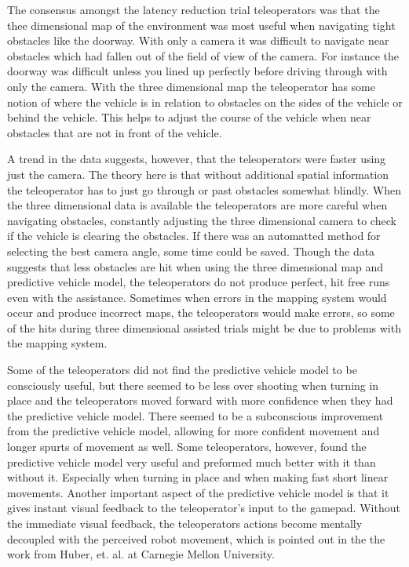 \documentclass[12pt]{report}
\begin{document}
The consensus amongst the latency reduction trial teleoperators was that the thee dimensional map of the environment was most useful when navigating tight obstacles like the doorway.  With only a camera it was difficult to navigate near obstacles which had fallen out of the field of view of the camera.  For instance the doorway was difficult unless you lined up perfectly before driving through with only the camera.  With the three dimensional map the teleoperator has some notion of where the vehicle is in relation to obstacles on the sides of the vehicle or behind the vehicle.  This helps to adjust the course of the vehicle when near obstacles that are not in front of the vehicle.

A trend in the data suggests, however, that the teleoperators were faster using just the camera.  The theory here is that without additional spatial information the teleoperator has to just go through or past obstacles somewhat blindly.  When the three dimensional data is available the teleoperators are more careful when navigating obstacles, constantly adjusting the three dimensional camera to check if the vehicle is clearing the obstacles.  If there was an automatted method for selecting the best camera angle, some time could be saved.  Though the data suggests that less obstacles are hit when using the three dimensional map and predictive vehicle model, the teleoperators do not produce perfect, hit free runs even with the assistance.  Sometimes when errors in the mapping system would occur and produce incorrect maps, the teleoperators would make errors, so some of the hits during three dimensional assisted trials might be due to problems with the mapping system.

Some of the teleoperators did not find the predictive vehicle model to be consciously useful, but there seemed to be less over shooting when turning in place and the teleoperators moved forward with more confidence when they had the predictive vehicle model.  There seemed to be a subconscious improvement from the predictive vehicle model, allowing for more confident movement and longer spurts of movement as well.  Some teleoperators, however, found the predictive vehicle model very useful and preformed much better with it than without it.  Especially when turning in place and when making fast short linear movements.  Another important aspect of the predictive vehicle model is that it gives instant visual feedback to the teleoperator's input to the gamepad.  Without the immediate visual feedback, the teleoperators actions become mentally decoupled with the perceived robot movement, which is pointed out in the the work from Huber, et. al. at Carnegie Mellon University\cite{photo_real}.
\end{document}
